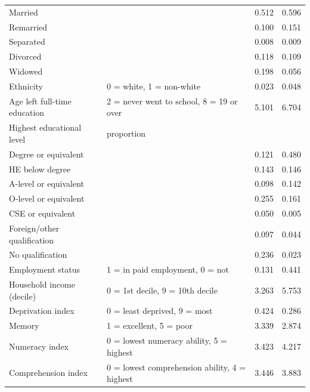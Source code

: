 \begin{table}
\begin{tabular}{llcc}
        \hspace{0.5cm} Married &  & 0.512 & 0.596 \\
        \hspace{0.5cm} Remarried &  & 0.100 & 0.151 \\
        \hspace{0.5cm} Separated &  & 0.008 & 0.009 \\
        \hspace{0.5cm} Divorced &  & 0.118 & 0.109 \\
        \hspace{0.5cm} Widowed &  & 0.198 & 0.056 \\
        Ethnicity & 0 = white, 1 = non-white & 0.023 & 0.048 \\
        Age left full-time education & 2 = never went to school, 8 = 19 or over & 5.101 & 6.704 \\
        Highest educational level & proportion & & \\
        \hspace{0.5cm} Degree or equivalent &  & 0.121 & 0.480 \\
        \hspace{0.5cm} HE below degree &  & 0.143 & 0.146 \\
        \hspace{0.5cm} A-level or equivalent &  & 0.098 & 0.142 \\
        \hspace{0.5cm} O-level or equivalent &  & 0.255 & 0.161 \\
        \hspace{0.5cm} CSE or equivalent &  & 0.050 & 0.005 \\
        \hspace{0.5cm} Foreign/other qualification &  & 0.097 & 0.044 \\
        \hspace{0.5cm} No qualification &  & 0.236 & 0.023 \\
        Employment status & 1 = in paid employment, 0 = not & 0.131 & 0.441 \\
        Household income (decile) & 0 = 1st decile, 9 = 10th decile & 3.263 & 5.753 \\
        Deprivation index & 0 = least deprived, 9 = most & 0.424 & 0.286 \\
        Memory & 1 = excellent, 5 = poor & 3.339 & 2.874 \\
        Numeracy index & 0 = lowest numeracy ability, 5 = highest & 3.423 & 4.217 \\
        Comprehension index & 0 = lowest comprehension ability, 4 = highest & 3.446 & 3.883 \\
        \bottomrule
    \end{tabular}
\end{table}

